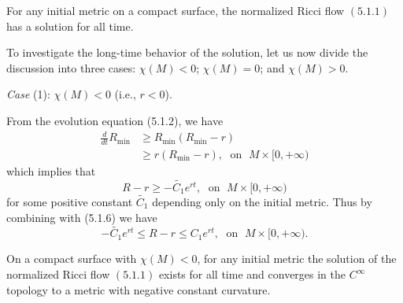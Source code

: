 \begin{proposition} 
  \label{prop:cz-normalized-surface-flow-immortal}

For any initial metric on a compact surface, the normalized Ricci
flow $(5.1.1)$ has a solution for all time.
\end{proposition}

To investigate the long-time behavior of the solution, let us now
divide the discussion into three cases: $\chi(M)<0$; $\chi(M)=0$;
and $\chi(M)>0$.

\medskip
{\it Case} (1): $\chi(M)<0$ (i.e., $r<0$).

\smallskip
{}From the evolution equation (5.1.2), we have
\begin{align*}
\frac{d}{dt}R_{\min}&  \geq R_{\min}(R_{\min}-r) \\
&  \geq r(R_{\min}-r), \; \text{ on } \; M\times [0,+\infty)
\end{align*}
which implies that
$$
R-r\geq-\tilde{C_1}e^{rt}, \; \text{ on } \; M\times[0,+\infty)
$$
for some positive constant $\tilde{C_1}$ depending only on the
initial metric. Thus by combining with (5.1.6) we have \begin{equation}
-\tilde{C_1}e^{rt}\leq R-r \leq C_1e^{rt}, \; \text{ on } \;
M\times
[0,+\infty). %
\end{equation}

\begin{theorem}
  \label{thm:cz-negative-euler-surface-convergence}

On a compact surface with $\chi(M)<0$, for any initial metric the
solution of the normalized Ricci flow $(5.1.1)$ exists for all
time and converges in the $C^{\infty}$ topology to a metric with
negative constant curvature.
\end{theorem}

